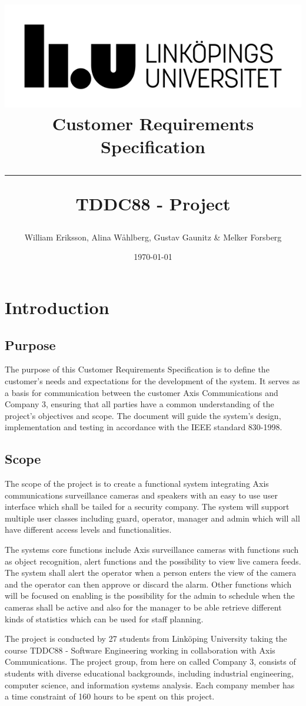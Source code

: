 \documentclass{article}
\title{
\includegraphics[scale=1.5]{liu_logga.png} \\
\vspace{2.0cm} \textbf{Customer Requirements Specification} \\
 \endgraf\rule{\textwidth}{.4pt}
  \large \textbf{TDDC88 - Project}\\
 
   }
\author{William Eriksson, Alina Wåhlberg, Gustav Gaunitz \& Melker Forsberg}
\date{\today}
\begin{document}
\maketitle


\newpage
\tableofcontents
\newpage

\section{Introduction}


\subsection{Purpose}
The purpose of this Customer Requirements Specification is to define the customer’s needs and expectations for the development of the system. It serves as a basis for communication between the customer Axis Communications and Company 3, ensuring that all parties have a common understanding of the project’s objectives and scope. The document will guide the system's design, implementation and testing in accordance with the IEEE standard 830-1998.


\subsection{Scope}

The scope of the project is to create a functional system integrating Axis communications surveillance cameras and speakers with an easy to use user interface which shall be tailed for a security company. The system will support multiple user classes including guard, operator, manager and admin which will all have different access levels and functionalities. 

The systems core functions include Axis surveillance cameras with functions such as object recognition, alert functions and the possibility to view live camera feeds.  The system shall alert the operator when a person enters the view of the camera and the operator can then approve or discard the alarm. Other functions which will be focused on enabling is the possibility for the admin to schedule when the cameras shall be active and also for the manager to be able retrieve different kinds of statistics which can be used for staff planning. 

The project is conducted by 27 students from Linköping University taking the course TDDC88 - Software Engineering working in collaboration with Axis Communications. The project group, from here on called Company 3, consists of students with diverse educational backgrounds, including industrial engineering, computer science, and information systems analysis. Each company member has a time constraint of 160 hours to be spent on this project. 
\end{document}
